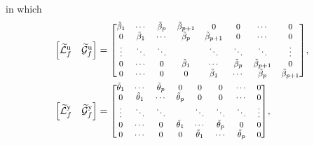 in which
{\begingroup\allowdisplaybreaks
\begin{align*}
    \begin{bmatrix}
        \widetilde{\mathcal{L}}^\mathrm{u}_f & \widetilde{\mathcal{G}}^\mathrm{u}_f 
    \end{bmatrix}&= {\scriptsize
    \begin{bmatrix}
        \tilde{\beta}_1     & \cdots      & \tilde{\beta}_{p}   & \tilde{\beta}_{p+1} & 0           & 0           & \cdots      & 0          \\
        0           & \tilde{\beta}_1     & \cdots      & \tilde{\beta}_{p}   & \tilde{\beta}_{p+1} & 0           & \cdots      & 0          \\
        \vdots      & \ddots      & \ddots      &             & \ddots      & \ddots      & \ddots      & \vdots     \\
        0           & \cdots      & 0           & \tilde{\beta}_1     & \cdots      & \tilde{\beta}_{p}   & \tilde{\beta}_{p+1} & 0          \\
        0           & \cdots      & 0           & 0           & \tilde{\beta}_1     & \cdots      & \tilde{\beta}_{p}   & \tilde{\beta}_{p+1}\\
    \end{bmatrix}
    },\\
    \begin{bmatrix}
        \widetilde{\mathcal{L}}^\mathrm{y}_f & \widetilde{\mathcal{G}}^\mathrm{y}_f 
    \end{bmatrix}&= {\scriptsize
    \begin{bmatrix}
        \tilde{\theta}_1    & \cdots      & \tilde{\theta}_{p}  & 0            & 0            & 0           & \cdots       & 0          \\
        0           & \tilde{\theta}_1    & \cdots      & \tilde{\theta}_{p}   & 0            & 0           & \cdots       & 0          \\
        \vdots      & \ddots      & \ddots      &              & \ddots       & \ddots      & \ddots       & \vdots     \\
        0           & \cdots      & 0           & \tilde{\theta}_1     & \cdots       & \tilde{\theta}_{p}  & 0            & 0          \\
        0           & \cdots      & 0           & 0            & \tilde{\theta}_1     & \cdots      & \tilde{\theta}_{p}   & 0          \\
    \end{bmatrix}},
\end{align*} \endgroup}%
